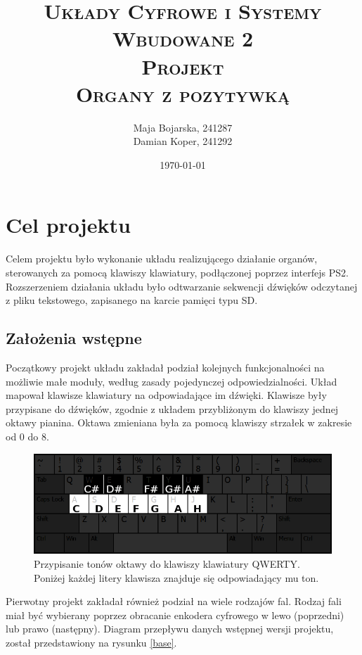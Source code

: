 \documentclass[12pt]{article}
\title{ 
    \vspace*{50mm}
    \textsc{
        \textbf{Układy Cyfrowe i Systemy Wbudowane 2}\\
        \large Projekt \\
         Organy z pozytywką
    }
}
\author{
Maja Bojarska, 241287\\
Damian Koper,  241292\\
}
\date{\today}
\begin{document}
\maketitle

\newpage

\section{Cel projektu}

Celem projektu było wykonanie układu realizującego działanie organów, sterowanych za pomocą klawiszy klawiatury, podłączonej poprzez interfejs PS2. Rozszerzeniem działania układu było odtwarzanie sekwencji dźwięków odczytanej z pliku tekstowego, zapisanego na karcie pamięci typu SD. 

\subsection{Założenia wstępne}

Początkowy projekt układu zakładał podział kolejnych funkcjonalności na możliwie małe moduły, według zasady pojedynczej odpowiedzialności. Układ mapował klawisze klawiatury na odpowiadające im dźwięki. Klawisze były przypisane do dźwięków, zgodnie z układem przybliżonym do klawiszy jednej oktawy pianina.  Oktawa zmieniana była za pomocą klawiszy strzałek w zakresie od 0 do 8.

\begin{figure}[H]
  \centering
  \includegraphics[width=\linewidth]{images/key_mapping.png}
  \caption{Przypisanie tonów oktawy do klawiszy klawiatury QWERTY. Poniżej każdej litery klawisza znajduje się odpowiadający mu ton.}
  \label{kay_mapping}
\end{figure}

Pierwotny projekt zakładał również podział na wiele rodzajów fal. Rodzaj fali miał być wybierany poprzez obracanie enkodera cyfrowego w lewo (poprzedni) lub prawo (następny). Diagram przepływu danych wstępnej wersji projektu, został przedstawiony na rysunku \ref{base}.
\end{document}
